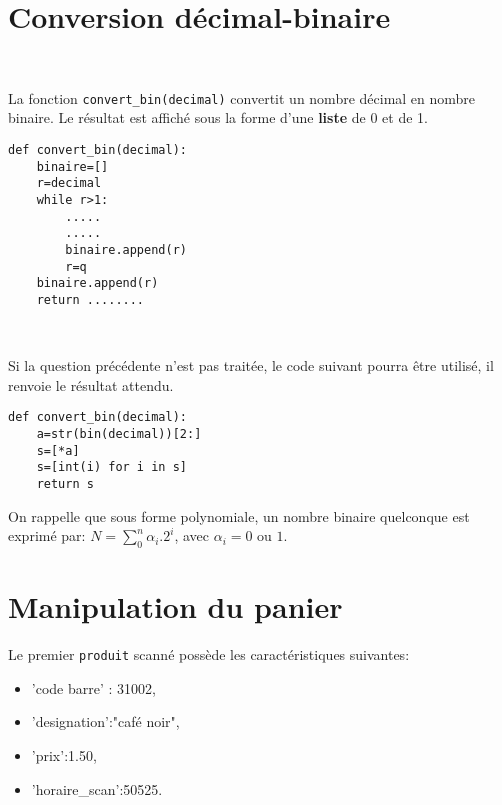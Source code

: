 \section{Conversion décimal-binaire}


~\

La fonction \texttt{convert\_bin(decimal)} convertit un nombre décimal en nombre binaire. Le résultat est affiché sous la forme d'une \textbf{liste} de 0 et de 1.

\newpage

\begin{verbatim}
def convert_bin(decimal):
    binaire=[]
    r=decimal
    while r>1:
        .....
        .....
        binaire.append(r)
        r=q
    binaire.append(r)
    return ........
\end{verbatim}


~\

Si la question précédente n'est pas traitée, le code suivant pourra être utilisé, il renvoie le résultat attendu.

\begin{verbatim}
def convert_bin(decimal):
    a=str(bin(decimal))[2:]
    s=[*a]
    s=[int(i) for i in s]
    return s
\end{verbatim}

On rappelle que sous forme polynomiale, un nombre binaire quelconque est exprimé par: $N=\sum\limits_{0}^n \alpha_i.2^i$, avec $\alpha_i=0$ ou $1$.


\section{Manipulation du panier}

Le premier \texttt{produit} scanné possède les caractéristiques suivantes:
\begin{itemize}
 \item 'code barre' : 31002,
 \item 'designation':"café noir",
 \item 'prix':1.50,
 \item 'horaire\_scan':50525.
\end{itemize}

